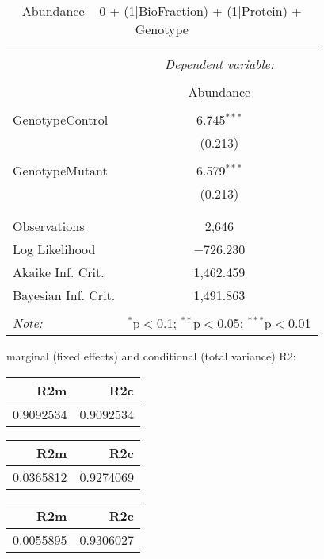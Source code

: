 \documentclass[11pt]{report}
\begin{document}
\begin{table}[!htbp] \centering 
  \caption{Abundance ~ 0 + (1|BioFraction) + (1|Protein) + Genotype} 
  \label{} 
\begin{tabular}{@{\extracolsep{5pt}}lc} 
\\[-1.8ex]\hline 
\hline \\[-1.8ex] 
 & \multicolumn{1}{c}{\textit{Dependent variable:}} \\ 
\cline{2-2} 
\\[-1.8ex] & Abundance \\ 
\hline \\[-1.8ex] 
 GenotypeControl & 6.745$^{***}$ \\ 
  & (0.213) \\ 
  & \\ 
 GenotypeMutant & 6.579$^{***}$ \\ 
  & (0.213) \\ 
  & \\ 
\hline \\[-1.8ex] 
Observations & 2,646 \\ 
Log Likelihood & $-$726.230 \\ 
Akaike Inf. Crit. & 1,462.459 \\ 
Bayesian Inf. Crit. & 1,491.863 \\ 
\hline 
\hline \\[-1.8ex] 
\textit{Note:}  & \multicolumn{1}{r}{$^{*}$p$<$0.1; $^{**}$p$<$0.05; $^{***}$p$<$0.01} \\ 
\end{tabular} 
\end{table} 
marginal (fixed effects) and conditional (total variance) R2:

\begin{tabular}{r|r}
\hline
R2m & R2c\\
\hline
0.9092534 & 0.9092534\\
\hline
\end{tabular}

\begin{tabular}{r|r}
\hline
R2m & R2c\\
\hline
0.0365812 & 0.9274069\\
\hline
\end{tabular}

\begin{tabular}{r|r}
\hline
R2m & R2c\\
\hline
0.0055895 & 0.9306027\\
\hline
\end{tabular}
\end{document}
